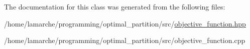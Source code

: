 The documentation for this class was generated from the following files\-:\begin{DoxyCompactItemize}
\item 
/home/lamarche/programming/optimal\-\_\-partition/src/\hyperlink{objective__function_8hpp}{objective\-\_\-function.\-hpp}\item 
/home/lamarche/programming/optimal\-\_\-partition/src/objective\-\_\-function.\-cpp\end{DoxyCompactItemize}
